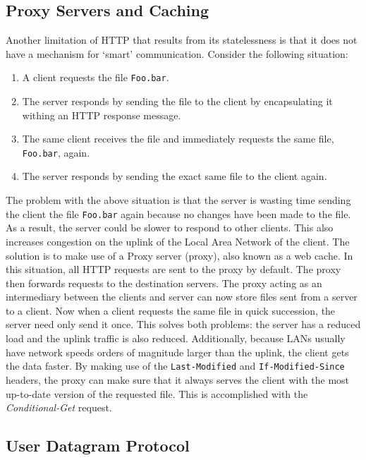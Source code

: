\documentclass[10pt,twocolumn]{witseiepaper}
\begin{document}
	\subsection{Proxy Servers and Caching}
	\label{sec:proxy}
	Another limitation of HTTP that results from its statelessness is that it does not have a mechanism for `smart' communication. Consider the following situation:

	\begin{enumerate}
		\item A client requests the file \texttt{Foo.bar}.
		\item The server responds by sending the file to the client by encapsulating it withing an HTTP response message.
		\item The same client receives the file and immediately requests the same file, \texttt{Foo.bar}, again.
		\item The server responds by sending the exact same file to the client again.
	\end{enumerate} 

	The problem with the above situation is that the server is wasting time sending the client the file \texttt{Foo.bar} again because no changes have been made to the file. As a result, the server could be slower to respond to other clients. This also increases congestion on the uplink of the Local Area Network of the client. The solution is to make use of a Proxy server (proxy), also known as a web cache. In this situation, all HTTP requests are sent to the proxy by default. The proxy then forwards requests to the destination servers. The proxy acting as an intermediary between the clients and server can now store files sent from a server to a client. Now when a client requests the same file in quick succession, the server need only send it once. This solves both problems: the server has a reduced load and the uplink traffic is also reduced. Additionally, because LANs usually have network speeds orders of magnitude larger than the uplink, the client gets the data faster. By making use of the \texttt{Last-Modified} and \texttt{If-Modified-Since} headers, the proxy can make sure that it always serves the client with the most up-to-date version of the requested file. This is accomplished with the \emph{Conditional-Get} request. 	

	\subsection{User Datagram Protocol}
\end{document}
